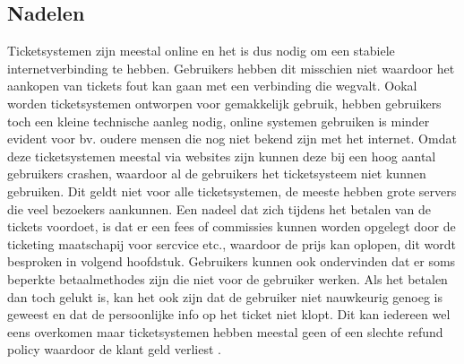 \subsection{Nadelen}
Ticketsystemen zijn meestal online en het is dus nodig om een stabiele internetverbinding te hebben. Gebruikers hebben dit misschien niet waardoor het aankopen van tickets fout kan gaan met een verbinding die wegvalt. 
Ookal worden ticketsystemen ontworpen voor gemakkelijk gebruik, hebben gebruikers toch een kleine technische aanleg nodig, online systemen gebruiken is minder evident voor bv. oudere mensen die nog niet bekend zijn met het internet.
Omdat deze ticketsystemen meestal via websites zijn kunnen deze bij een hoog aantal gebruikers crashen, waardoor al de gebruikers het ticketsysteem niet kunnen gebruiken. Dit geldt niet voor alle ticketsystemen, de meeste hebben grote servers die veel bezoekers aankunnen.
Een nadeel dat zich tijdens het betalen van de tickets voordoet, is dat er een fees of commissies kunnen worden opgelegt door de ticketing maatschapij voor sercvice etc., waardoor de prijs kan oplopen, dit wordt besproken in volgend hoofdstuk.
Gebruikers kunnen ook ondervinden dat er soms beperkte betaalmethodes zijn die niet voor de gebruiker werken. Als het betalen dan toch gelukt is, kan het ook zijn dat de gebruiker niet nauwkeurig genoeg is geweest en dat de persoonlijke info op het ticket niet klopt.
Dit kan iedereen wel eens overkomen maar ticketsystemen hebben meestal geen of een slechte refund policy waardoor de klant geld verliest \cite{concert-tickets-online2021}. 

